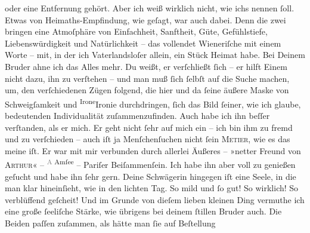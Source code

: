 \begin{ledgroupsized}[t]{13cm}
               oder eine Entfernung gehört. Aber ich weiß wirklich nicht, wie ichs nennen ſoll.
               Etwas von Heimaths-Empfindung, wie geſagt, {\pb}war auch
               dabei. Denn die zwei bringen eine Atmoſphäre von Einfachheit, Sanftheit, Güte,
               Gefühlstiefe, Liebenswürdigkeit und Natürlichkeit – das vollendet Wieneriſche mit
               einem Worte – mit, in der ich Vaterlandsloſer allein, \strikeout{\textcolor{gray}{man}} ein Stück Heimat habe. Bei Deinem Bruder ahne ich das Alles mehr.
               Du weißt, er verſchließt ſich – er hilft Einem nicht dazu, ihn zu verſtehen – und man
               muß ſich ſelbſt auf die Suche machen, um, den verſchiedenen Zügen folgend, die hier
               und da ſeine äußere Maske von Schweigſamkeit und \substVorne{}\textsuperscript{Irone}\substDazwischen{}Ironie\substHinten{} durchdringen, ſich {\pb}das Bild ſeiner, wie
               ich glaube, bedeutenden Individualität zuſammenzufinden. Auch habe ich ihn beſſer
               verſtanden, als er mich. Er geht nicht ſehr auf mich ein – ich bin ihm zu fremd und
               zu verſchieden – auch iſt ja Menſchenſuchen nicht ſein \textsc{Metier}, wie es das meine iſt. Er war mit mir verbunden durch allerlei
               Äußeres – »netter Freund von \textsc{Arthur}« – \substVorne{}\textsuperscript{\textcolor{gray}{A} Amſee}{\allowbreak}\substDazwischen{}\textsc{\label{K_L02608-1v}\label{K_L02608-1h}}\substHinten{} – Pariſer Beiſammenſein. Ich habe ihn aber
               voll zu genießen geſucht und habe ihn ſehr gern. Deine Schwägerin hingegen iſt eine Seele, in die man klar
               hineinſieht, wie in den lichten Tag. So mild {\pb}und ſo
               gut! So wirklich! So verblüffend geſcheit! Und im Grunde von dieſem lieben kleinen
                  Ding vermuthe ich eine große
               ſeeliſche Stärke, wie übrigens bei deinem ſtillen Bruder auch. Die Beiden paſſen zuſammen, als hätte man ſie auf Beſtellung

\end{ledgroupsized}
